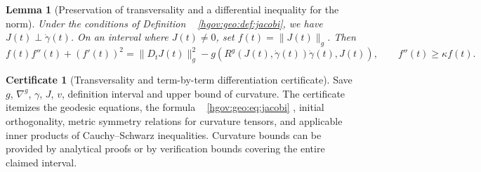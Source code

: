 \documentclass[12pt,a4paper,openany,notitlepage]{report}
\theoremstyle{plain}
\newtheorem{lemma}[theorem]{Lemma}
\theoremstyle{definition}
\newtheorem*{certificate}{Certificate}
\theoremstyle{remark}
\begin{document}
\begin{CJK*}
\begin{lemma} [Preservation of transversality and a differential inequality for the norm]
\label{hgov:geo:lem:norm}
Under the conditions of Definition ~ \ref{hgov:geo:def:jacobi}, we have $J(t)\perp\dot\gamma(t)$. On an interval where $J(t)\ne0$, set $f(t)=\lVert J(t)\rVert_g$. Then
\begin{equation}
\label{hgov:geo:eq:norm-inequality}
f(t)f''(t)+(f'(t))^2
=\lVert D_tJ(t)\rVert_g^2
-g(R^g(J(t),\dot\gamma(t))\dot\gamma(t),J(t)),
\qquad f''(t)\ge\kappa f(t).
\end{equation}
\end{lemma}

\begin{certificate}
[Transversality and term-by-term differentiation certificate]Save $g$, $\nabla^g$, $\gamma$, $J$, $v$, definition interval and upper bound of curvature. The certificate itemizes the geodesic equations, the formula ~ \eqref{hgov:geo:eq:jacobi} , initial orthogonality, metric symmetry relations for curvature tensors, and applicable inner products of Cauchy--Schwarz inequalities. Curvature bounds can be provided by analytical proofs or by verification bounds covering the entire claimed interval.\end{certificate}



\end{CJK*}
\end{document}
